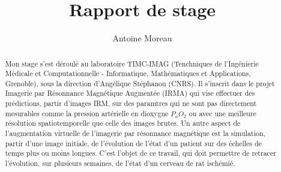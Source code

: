 \documentclass[a4paper,10pt]{article}
\title{Rapport de stage}
\author{Antoine Moreau}
\begin{document}
\maketitle

\begin{abstract}
Mon stage s'est d\'eroul\'e au laboratoire TIMC-IMAG (Tenchniques de l'Ingénierie M\'edicale et Computationnelle - %
Informatique, Mathématiques et Applications, Grenoble), sous la direction d'Angélique Stéphanou (CNRS). %
Il s'inscrit dans le projet Imagerie par Résonnance Magn\'etique Augment\'ee (IRMA) qui vise  effectuer des pr\'edictions, %
 partir d'images IRM, sur des paramtres qui ne sont pas directement mesurables comme la pression art\'erielle en dioxygne $P_aO_2$ %
ou avec une meilleure r\'esolution spatiotemporelle que celle des images brutes. %
Un autre aspect de l'augmentation virtuelle de l'imagerie par résonnance magnétique est la simulation,  partir d'une image initiale, %
de l'évolution de l'état d'un patient sur des \'echelles de temps plus ou moins longues. %
C'est l'objet de ce travail, qui doit permettre de retracer l'\'evolution, sur plusieurs semaines, de l'\'etat d'un cerveau de rat isch\'emi\'e.
\end{abstract}










\end{document}
